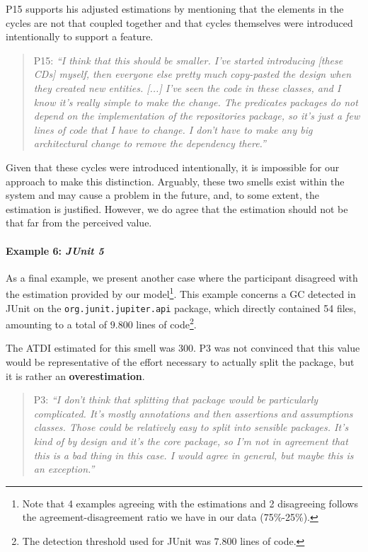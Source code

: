 P15 supports his adjusted estimations by mentioning that the elements in the cycles are not that coupled together and that cycles themselves were introduced intentionally to support a feature.

\begin{quote}
    P15: \emph{``I think that this should be smaller. I've started introducing [these CDs] myself, then everyone else pretty much copy-pasted the design when they created new entities. 
    [...] I've seen the code in these classes, and I know it's really simple to make the change. The predicates packages do not depend on the implementation of the repositories package, so it's just a few lines of code that I have to change. I don't have to make any big architectural change to remove the dependency there.''}
\end{quote}

Given that these cycles were introduced intentionally, it is impossible for our approach to make this distinction.
Arguably, these two smells exist within the system and may cause a problem in the future, and, to some extent, the estimation is justified.
However, we do agree that the estimation should not be that far from the perceived value.

\paragraph{Example 6: \emph{JUnit 5}}
As a final example, we present another case where the participant disagreed with the estimation provided by our model\footnote{Note that 4 examples agreeing with the estimations and 2 disagreeing follows the agreement-disagreement ratio we have in our data (75\%-25\%).}.
This example concerns a GC detected in JUnit on the \texttt{org.junit.jupiter.api} package, which directly contained 54 files, amounting to a total of $9.800$ lines of code\footnote{The detection threshold used for JUnit was $7.800$ lines of code.}.

The ATDI estimated for this smell was 300. P3 was not convinced that this value would be representative of the effort necessary to actually split the package, but it is rather an \textbf{overestimation}.

\begin{quote}
    P3: \emph{``I don't think that splitting that package would be particularly complicated. It's mostly annotations and then assertions and assumptions classes. Those could be relatively easy to split into sensible packages. It's kind of by design and it's the core package, so I'm not in agreement that this is a bad thing in this case. I would agree in general, but maybe this is an exception.''}
\end{quote}

